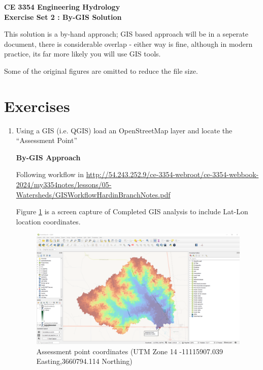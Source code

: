 \documentclass[12pt]{article}
\begin{document}
\begin{center}
{\textbf{{ CE 3354 Engineering Hydrology} \\ {Exercise Set 2 : By-GIS Solution}}}
\end{center}

This solution is a by-hand approach; GIS based approach will be in a seperate document, there is considerable overlap - either way is fine, although in modern practice, its far more likely you will use GIS tools.  

Some of the original figures are omitted to reduce the file size.

\section*{\small{Exercises}}

\begin{enumerate}
\item Using a GIS (i.e. QGIS) load an OpenStreetMap layer and locate the ``Assessment Point'' 

\textbf{By-GIS Approach}

Following workflow in \url{http://54.243.252.9/ce-3354-webroot/ce-3354-webbook-2024/my3354notes/lessons/05-Watersheds/GISWorkflowHardinBranchNotes.pdf}

Figure \ref{fig:byGISfig1} is a screen capture of Completed GIS analysis to include Lat-Lon location coordinates.

\begin{figure}[h!] %
   \centering
   \includegraphics[width=6in]{HardinBranchGISAssessmentPoint.png} 
   \caption{Assessment point coordinates (UTM Zone 14 -11115907.039 Easting,3660794.114 Northing)}
   \label{fig:byGISfig1}
\end{figure}


\end{enumerate}
\end{document}
